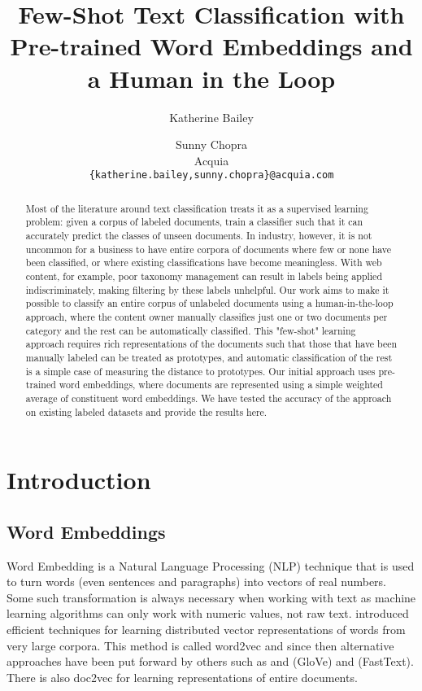\documentclass[11pt,letterpaper]{article}
\title{Few-Shot Text Classification with Pre-trained Word Embeddings and a Human in the Loop}
\author{Katherine Bailey\and Sunny Chopra \\
  Acquia \\
  \texttt{\{katherine.bailey,sunny.chopra\}@acquia.com}
}
\date{}
\begin{document}
\maketitle

\begin{abstract}
Most of the literature around text classification treats it as a supervised learning problem: given a corpus of labeled documents, train a classifier such that it can accurately predict the classes of unseen documents. In industry, however, it is not uncommon for a business to have entire corpora of documents where few or none have been classified, or where existing classifications have become meaningless. With web content, for example, poor taxonomy management can result in labels being applied indiscriminately, making filtering by these labels unhelpful. Our work aims to make it possible to classify an entire corpus of unlabeled documents using a human-in-the-loop approach, where the content owner manually classifies just one or two documents per category and the rest can be automatically classified. This "few-shot" learning approach requires rich representations of the documents such that those that have been manually labeled can be treated as prototypes, and automatic classification of the rest is a simple case of measuring the distance to prototypes. Our initial approach uses pre-trained word embeddings, where documents are represented using a simple weighted average of constituent word embeddings. We have tested the accuracy of the approach on existing labeled datasets and provide the results here.
\end{abstract}

\section{Introduction}

\subsection*{Word Embeddings}

Word Embedding is a Natural Language Processing (NLP) technique that is used to turn words (even sentences and paragraphs) into vectors of real numbers. Some such transformation is always necessary when working with text as machine learning algorithms can only work with numeric values, not raw text.  introduced efficient techniques for learning distributed vector representations of words from very large corpora. This method is called word2vec and since then alternative approaches have been put forward by others such as and  (GloVe) and  (FastText). There is also doc2vec for learning representations of entire documents.
\end{document}
